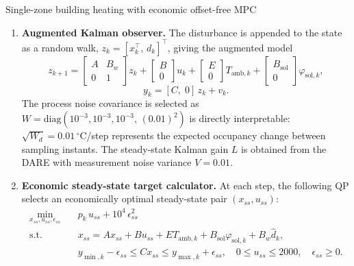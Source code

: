 \begin{examplebox}{Single-zone building heating with economic offset-free MPC}
\begin{enumerate}
	\item \textbf{Augmented Kalman observer.}
	The disturbance is appended to the state as a random walk,
	$z_k = [x_k^\top,\, d_k]^\top$, giving the augmented model
	\[
	z_{k+1} =
	\begin{bmatrix} A & B_w \\ 0 & 1 \end{bmatrix} z_k
	+ \begin{bmatrix} B \\ 0 \end{bmatrix} u_k
	+ \begin{bmatrix} E \\ 0 \end{bmatrix} T_{\mathrm{amb},k}
	+ \begin{bmatrix} B_{\mathrm{sol}} \\ 0 \end{bmatrix} \varphi_{\mathrm{sol},k},
	\]
	\[
	y_k = [C,\;0]\,z_k + v_k.
	\]
	 The process noise covariance is selected as
	$W = \mathrm{diag}(10^{-3},10^{-3},10^{-3},\,(0.01)^2)$
	is directly interpretable: $\sqrt{W_d}=0.01\,^\circ$C/step
	represents the expected occupancy change between sampling instants.
	The steady-state Kalman gain $L$ is obtained from the DARE with
	measurement noise variance $V=0.01$.
	
	\item \textbf{Economic steady-state target calculator.}
	At each step, the following QP selects an economically optimal
	steady-state pair $(x_{ss}, u_{ss})$:
	\begin{align*}
		\min_{x_{ss},u_{ss},\epsilon_{ss}} \quad
		& p_k\,u_{ss} + 10^4\,\epsilon_{ss}^2 \\
		\text{s.t.} \quad
		& x_{ss} = A x_{ss} + B u_{ss}
		+ E T_{\mathrm{amb},k}
		+ B_{\mathrm{sol}}\varphi_{\mathrm{sol},k}
		+ B_w \hat d_k, \\
		& y_{\min,k}-\epsilon_{ss} \le C x_{ss} \le y_{\max,k}+\epsilon_{ss},
		\quad 0 \le u_{ss} \le 2000,\quad \epsilon_{ss}\ge 0.
	\end{align*}
	

\end{enumerate}
\end{examplebox}
